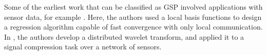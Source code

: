 Some of the earliest work that can be classified as GSP involved applications with sensor data, for example \cite{Guestrin2004}. Here, the authors used a local basis functions to design a regression algorithm capable of fast convergence with only local communication. In \cite{Wagner2005}, the authors develop a distributed wavelet transform, and applied it to a signal compression task over a network of sensors. 

